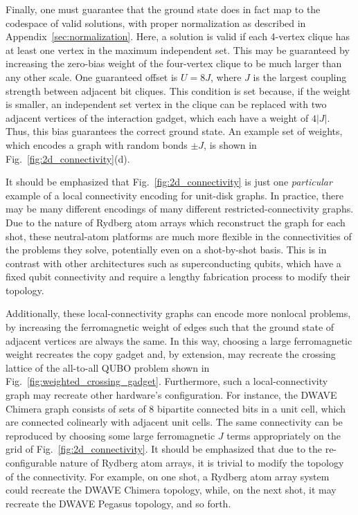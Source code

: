 Finally, one must guarantee that the ground state does in fact map to the codespace of valid solutions, with proper normalization as described in Appendix~\ref{sec:normalization}. Here, a solution is valid if each 4-vertex clique has at least one vertex in the maximum independent set. This may be guaranteed by increasing the zero-bias weight of the four-vertex clique to be much larger than any other scale. One guaranteed offset is $U = 8J$, where $J$ is the largest coupling strength between adjacent bit cliques. This condition is set because, if the weight is smaller, an independent set vertex in the clique can be replaced with two adjacent vertices of the interaction gadget, which each have a weight of $4|J|$. Thus, this bias guarantees the correct ground state. An example set of weights, which encodes a graph with random bonds $\pm J$, is shown in Fig.~\ref{fig:2d_connectivity}(d).

It should be emphasized that Fig.~\ref{fig:2d_connectivity} is just one \textit{particular} example of a local connectivity encoding for unit-disk graphs. In practice, there may be many different encodings of many different restricted-connectivity graphs. Due to the nature of Rydberg atom arrays which reconstruct the graph for each shot, these neutral-atom platforms are much more flexible in the connectivities of the problems they solve, potentially even on a shot-by-shot basis. This is in contrast with other architectures such as superconducting qubits, which have a fixed qubit connectivity and require a lengthy fabrication process to modify their topology.

Additionally, these local-connectivity graphs can encode more nonlocal problems, by increasing the ferromagnetic weight of edges such that the ground state of adjacent vertices are always the same. In this way, choosing a large ferromagnetic weight recreates the copy gadget and, by extension, may recreate the crossing lattice of the all-to-all QUBO problem shown in Fig.~\ref{fig:weighted_crossing_gadget}. Furthermore, such a local-connectivity graph may recreate other hardware’s configuration. For instance, the DWAVE Chimera graph \cite{DWAVE_topology} consists of sets of 8 bipartite connected bits in a unit cell, which are connected colinearly with adjacent unit cells. The same connectivity can be reproduced by choosing some large ferromagnetic $J$ terms appropriately on the grid of Fig.~\ref{fig:2d_connectivity}. It should be emphasized that due to the re-configurable nature of Rydberg atom arrays, it is trivial to modify the topology of the connectivity. For example, on one shot, a Rydberg atom array system could recreate the DWAVE Chimera topology, while, on the next shot, it may recreate the DWAVE Pegasus topology, and so forth.

